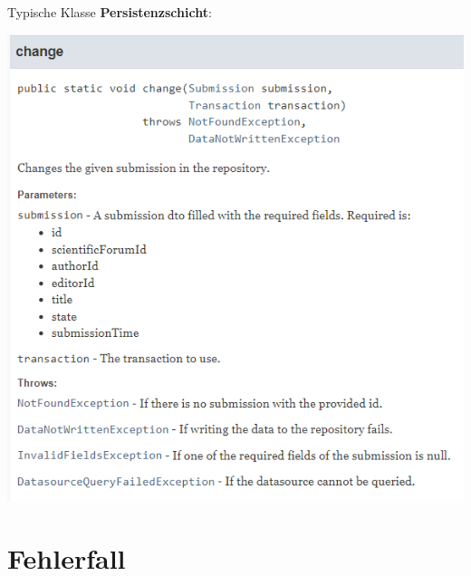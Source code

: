\documentclass{beamer}
\begin{document}
\begin{frame}{Typische Klasse \textbf{Persistenzschicht}:}
\begin{itemize}
            \includegraphics[height=1.1\textheight]{graphics/repo/doc_change}

        \end{itemize}
    \end{frame}

    \section{Fehlerfall}
\end{document}
